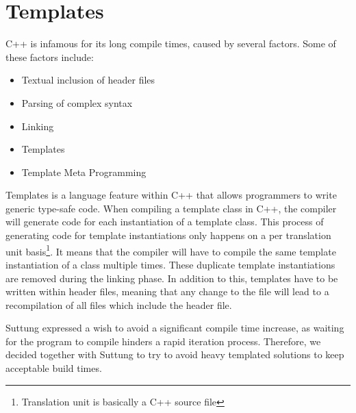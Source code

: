 \section{Templates}
\label{sec:requirements_templates}
C++ is infamous for its long compile times, caused by several factors\cite{stack_overflow_why_does_cpp_compilation_take_so_long}.
Some of these factors include:
\begin{itemize}
    \item
    Textual inclusion of header files

    \item
    Parsing of complex syntax

    \item
    Linking

    \item
    Templates

    \item
    Template Meta Programming
\end{itemize}

Templates is a language feature within C++ that allows programmers to write generic type-safe code.
When compiling a template class in C++, the compiler will generate code for each instantiation of a template class.
This process of generating code for template instantiations only happens on a per translation unit basis\footnote{Translation unit is basically a C++ source file}.
It means that the compiler will have to compile the same template instantiation of a class multiple times.
These duplicate template instantiations are removed during the linking phase.
In addition to this, templates have to be written within header files,
meaning that any change to the file will lead to a recompilation of all files which include the header file\cite{dr_dobbs_cpp_compilation_speed}.

Suttung expressed a wish to avoid a significant compile time increase, as waiting for the program to compile hinders a rapid iteration process.
Therefore, we decided together with Suttung to try to avoid heavy templated solutions to keep acceptable build times.

